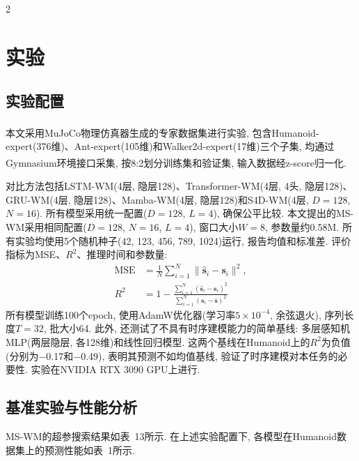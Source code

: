 \begin{multicols}{2}
\section{实验}

\subsection{实验配置}

本文采用MuJoCo\textsuperscript{\cite{28}}物理仿真器生成的专家数据集进行实验, 包含Humanoid-expert(376维)、Ant-expert(105维)和Walker2d-expert(17维)三个子集, 均通过Gymnasium\textsuperscript{\cite{29}}环境接口采集, 按8:2划分训练集和验证集, 输入数据经z-score归一化.

对比方法包括LSTM-WM(4层, 隐层128)、Transformer-WM(4层, 4头, 隐层128)、GRU-WM(4层, 隐层128)、Mamba-WM(4层, 隐层128)和S4D-WM(4层, $D{=}128$, $N{=}16$). 所有模型采用统一配置($D{=}128$, $L{=}4$), 确保公平比较. 本文提出的MS-WM采用相同配置($D{=}128$, $N{=}16$, $L{=}4$), 窗口大小$W{=}8$, 参数量约0.58M. 所有实验均使用5个随机种子(42, 123, 456, 789, 1024)运行, 报告均值和标准差. 评价指标为MSE、$R^2$、推理时间和参数量:
\begin{align}
\text{MSE} &= \frac{1}{N}\sum_{i=1}^{N}\|\hat{{\bm s}}_i - {\bm s}_i\|^2, \\
R^2 &= 1 - \frac{\sum_{i=1}^{N}(\hat{{\bm s}}_i - {\bm s}_i)^2}{\sum_{i=1}^{N}({\bm s}_i - \bar{{\bm s}})^2}
\end{align} 所有模型训练100个epoch, 使用AdamW优化器(学习率$5\times10^{-4}$, 余弦退火), 序列长度$T=32$, 批大小64. 此外, 还测试了不具有时序建模能力的简单基线: 多层感知机MLP(两层隐层, 各128维)和线性回归模型. 这两个基线在Humanoid上的$R^2$为负值(分别为$-$0.17和$-$0.49), 表明其预测不如均值基线, 验证了时序建模对本任务的必要性. 实验在NVIDIA RTX 3090 GPU上进行.

\subsection{基准实验与性能分析}

MS-WM的超参搜索结果如表~13所示. 在上述实验配置下, 各模型在Humanoid数据集上的预测性能如表~1所示.


\end{multicols}
